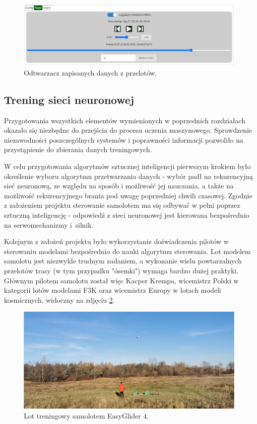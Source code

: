 \documentclass[12pt, a4paper]{article}
\begin{document}
 \begin{figure}[H]
    \centering
    \includegraphics[width=1\textwidth]{player}
    \caption{Odtwarzacz zapisanych danych z przelotów.}
    \label{fig:player}
\end{figure}

\FloatBarrier
\subsection{Trening sieci neuronowej}
Przygotowania wszystkich elementów wymienionych w poprzednich rozdziałach okazało się niezbędne do przejścia do procesu uczenia maszynowego. Sprawdzenie niezawodności poszczególnych systemów i poprawności informacji pozwoliło na przystąpienie do zbierania danych treningowych.

W celu przygotowania algorytmów sztucznej inteligencji pierwszym krokiem było określenie wyboru algorytmu przetwarzania danych - wybór padł na rekurencyjną sieć neuronową, ze względu na sposób i możliwość jej nauczania, a także na możliwość rekurencyjnego brania pod uwagę poprzedniej chwili czasowej. Zgodnie z założeniem projektu sterowanie samolotem ma się odbywać w pełni poprzez sztuczną inteligencję - odpowiedź z sieci neuronowej jest kierowana bezpośrednio na serwomechanizmy i~silnik. 

Kolejnym z założeń projektu było wykorzystanie doświadczenia pilotów w sterowaniu modelami  bezpośrednio do nauki algorytmu sterowania. Lot modelem samolotu jest niezwykle trudnym zadaniem, a wykonanie wielu powtarzalnych przelotów trasy (w tym przypadku "ósemki") wymaga bardzo dużej praktyki. Głównym pilotem samolotu został więc Kacper Krempa, wicemistrz Polski w kategorii lotów modelami F3K oraz wicemistrz Europy w lotach modeli kosmicznych, widoczny na zdjęciu \ref{fig:kacper}.

 \begin{figure}[ht]
    \centering
    \includegraphics[width=1\textwidth]{kacperlata}
    \caption{Lot treningowy samolotem EasyGlider 4.}
    \label{fig:kacper}
\end{figure}
\end{document}
